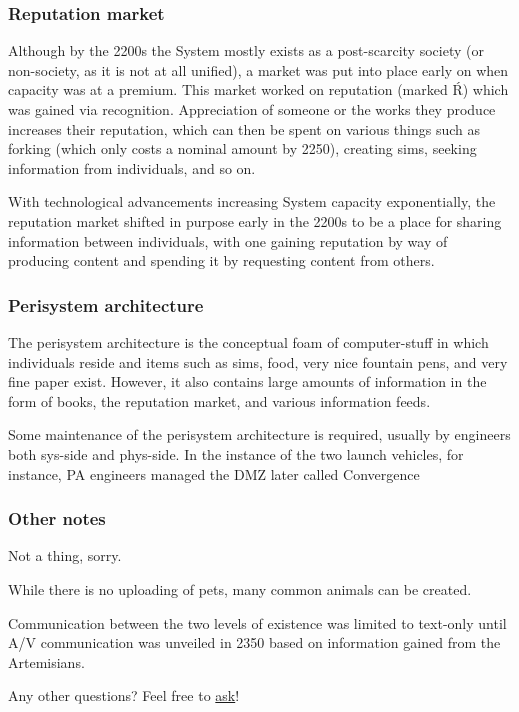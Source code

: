 \subsubsection{Reputation market}

Although by the 2200s the System mostly exists as a post-scarcity society (or non-society, as it is not at all unified), a market was put into place early on when capacity was at a premium. This market worked on reputation (marked Ŕ) which was gained via recognition. Appreciation of someone or the works they produce increases their reputation, which can then be spent on various things such as forking (which only costs a nominal amount by 2250), creating sims, seeking information from individuals, and so on.

With technological advancements increasing System capacity exponentially, the reputation market shifted in purpose early in the 2200s to be a place for sharing information between individuals, with one gaining reputation by way of producing content and spending it by requesting content from others.

\subsubsection{Perisystem architecture}

The perisystem architecture is the conceptual foam of computer-stuff in which individuals reside and items such as sims, food, very nice fountain pens, and very fine paper exist. However, it also contains large amounts of information in the form of books, the reputation market, and various information feeds.

Some maintenance of the perisystem architecture is required, usually by engineers both sys-side and phys-side. In the instance of the two launch vehicles, for instance, PA engineers managed the DMZ {later called Convergence}

\subsubsection{Other notes}

\begin{description}
\tightlist
\item[Children]
Not a thing, sorry.
\item[Pets]
While there is no uploading of pets, many common animals can be created.
\item[Communication between sys-side and phys-side]
Communication between the two levels of existence was limited to text-only until A/V communication was unveiled in 2350 based on information gained from the Artemisians.
\end{description}

Any other questions? Feel free to \href{https://makyo.is}{ask}!

